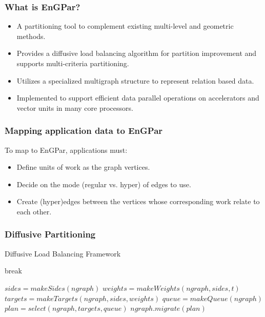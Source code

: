 \documentclass[aspectratio=169]{beamer}
\begin{document}
\begin{frame}
  \frametitle{What is EnGPar?}
  \begin{itemize}
  \item A partitioning tool to complement existing multi-level and geometric methods.
  \item Provides a diffusive load balancing algorithm for partition improvement and supports multi-criteria partitioning.
  \item Utilizes a specialized multigraph structure to represent relation based data.
  \item Implemented to support efficient data parallel operations on accelerators and vector units in many core processors.
  \end{itemize}
\end{frame}

\begin{frame}
  \frametitle{Mapping application data to EnGPar}
  To map to EnGPar, applications must:
  \begin{itemize}
  \item Define units of work as the graph vertices.
  \item Decide on the mode (regular vs. hyper) of edges to use.
  \item Create (hyper)edges between the vertices whose corresponding work relate to each other.
  \end{itemize}
\end{frame}


\begin{frame}
  \frametitle{Diffusive Partitioning}
  \begin{algorithm}[H]
    \caption{Diffusive Load Balancing Framework}
    \label{alg:engpar}
    \small
    \begin{algorithmic}[1]
      \State break
      \EndIf
      \EndWhile
      \EndFor
      \EndProcedure

      \State $sides = makeSides(ngraph)$
      \State $weights = makeWeights(ngraph,sides,t)$
      \State $targets = makeTargets(ngraph,sides,weights)$
      \State $queue = makeQueue(ngraph)$
      \State $plan = select(ngraph,targets,queue)$
      \State $ngraph.migrate(plan)$
      \EndProcedure
    \end{algorithmic}
  \end{algorithm}
\end{frame}
\end{document}
